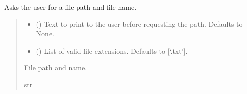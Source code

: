 \documentclass[letterpaper,10pt,english]{sphinxmanual}
\begin{document}
\begin{fulllineitems}
\begin{fulllineitems}
\label{\detokenize{GetUserInput:GetUserInput.UserInput.GetFilePath}}
\pysigstartsignatures
{}
\pysigstopsignatures
\sphinxAtStartPar
Asks the user for a file path and file name.
\begin{quote}\begin{description}
\begin{itemize}
\item {} 
\sphinxAtStartPar
{} (\sphinxstyleliteralemphasis{\sphinxupquote{ | }}\sphinxstyleliteralemphasis{\sphinxupquote{, }}) \textendash{} Text to print to the user before requesting the path. Defaults to None.

\item {} 
\sphinxAtStartPar
{} (\sphinxstyleliteralemphasis{\sphinxupquote{{[}}}\sphinxstyleliteralemphasis{\sphinxupquote{{]}}}\sphinxstyleliteralemphasis{\sphinxupquote{, }}) \textendash{} List of valid file extensions. Defaults to {[}‘.txt’{]}.

\end{itemize}

\sphinxAtStartPar
File path and name.

\sphinxAtStartPar
str

\end{description}\end{quote}

\end{fulllineitems}


\end{fulllineitems}
\end{document}
